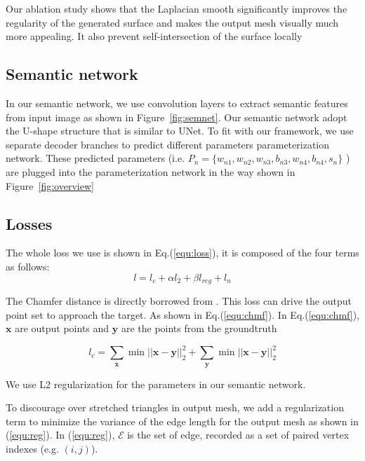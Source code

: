 Our ablation study shows that the Laplacian smooth significantly improves the regularity of the generated surface and makes the output mesh visually much more appealing. It also prevent self-intersection of the surface locally
\subsection{Semantic network}
\label{subsec:semnet}
In our semantic network, we use convolution layers to extract semantic features from input image as shown in Figure~\ref{fig:semnet}.  Our semantic network adopt the U-shape structure that is similar to UNet\cite{unet}. To fit with our framework, we use separate decoder branches to predict different parameters parameterization network. These predicted parameters (i.e. $P_n=\{w_{n1},w_{n2},w_{n3},b_{n3},w_{n4},b_{n4},s_{n}\}$ ) are plugged into the parameterization network in the way shown in Figure~\ref{fig:overview}

\subsection{Losses}
The whole loss we use is shown in Eq.(\ref{equ:loss}), it is composed of the four terms as follows:
\begin{equation}
\label{equ:loss}
l = l_c + \alpha l_2 + \beta l_{reg} + l_n
\end{equation}

 The Chamfer distance is directly borrowed from \cite{PSGN}. This loss can drive the output point set to approach the target. As shown in Eq.(\ref{equ:chmf}). In Eq.(\ref{equ:chmf}), $\mathbf{x}$ are output points and $\mathbf{y}$ are the points from the groundtruth

\begin{equation}
\label{equ:chmf}
l_c = \sum_\mathbf{x} \min||\mathbf{x}-\mathbf{y}||_2^2+\sum_\mathbf{y} \min||\mathbf{x}-\mathbf{y}||_2^2
\end{equation}

 We use L2 regularization for the parameters in our semantic network. 

 To discourage over stretched triangles in output mesh, we add a regularization term to minimize the variance of the edge length for the output mesh as shown in (\ref{equ:reg}). In (\ref{equ:reg}), $\mathcal{E}$ is the set of edge, recorded as a set of paired vertex indexes (e.g. $(i,j)$).

